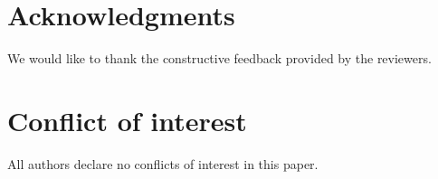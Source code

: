 \documentclass{aci}
\numberwithin{equation}{section}
\begin{document}
\section*{Acknowledgments}
We would like to thank the constructive feedback provided by the reviewers.

\section*{Conflict of interest}
All authors declare no conflicts of interest in this paper.



\end{document}
